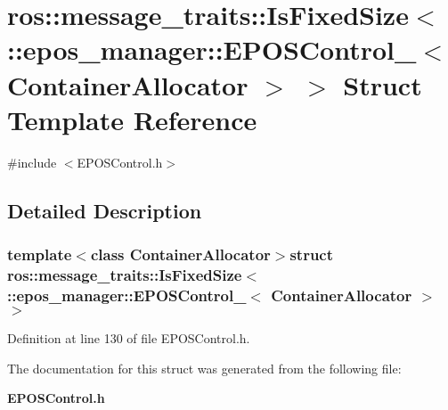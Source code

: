 \section{ros\-:\-:message\-\_\-traits\-:\-:\-Is\-Fixed\-Size$<$ \-:\-:epos\-\_\-manager\-:\-:\-E\-P\-O\-S\-Control\-\_\-$<$ \-Container\-Allocator $>$ $>$ \-Struct \-Template \-Reference}
\label{structros_1_1message__traits_1_1IsFixedSize_3_01_1_1epos__manager_1_1EPOSControl___3_01ContainerAllocator_01_4_01_4}


{\ttfamily \#include $<$\-E\-P\-O\-S\-Control.\-h$>$}



\subsection{\-Detailed \-Description}
\subsubsection*{template$<$class Container\-Allocator$>$struct ros\-::message\-\_\-traits\-::\-Is\-Fixed\-Size$<$ \-::epos\-\_\-manager\-::\-E\-P\-O\-S\-Control\-\_\-$<$ Container\-Allocator $>$ $>$}



\-Definition at line 130 of file \-E\-P\-O\-S\-Control.\-h.



\-The documentation for this struct was generated from the following file\-:\begin{DoxyCompactItemize}
\item 
{\bf \-E\-P\-O\-S\-Control.\-h}\end{DoxyCompactItemize}
